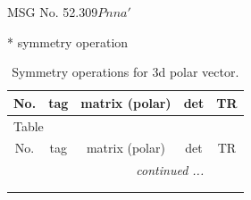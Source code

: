 \documentclass[fleqn,8pt]{jsarticle}
\begin{document}
\setcounter{MaxMatrixCols}{32}

\renewcommand{\tablename}{Table~}
\renewcommand{\figurename}{Figure~}
\begin{center}
\LARGE
MSG No. 52.309\quad$Pnna'$
\end{center}
* symmetry operation
\renewcommand{\arraystretch}{1.3}
\begin{longtable}{ccccc}
\caption{Symmetry operations for 3d polar vector.}
 \\
 \hline \hline
No. & tag & matrix (polar) & det & TR \\ \hline \endfirsthead

\multicolumn{4}{l}{\tablename\ \thetable{}} \\
 \hline \hline
No. & tag & matrix (polar) & det & TR \\ \hline \endhead

 \hline \hline
\multicolumn{4}{r}{\footnotesize\it continued ...} \\ \endfoot

 \hline \hline
\multicolumn{4}{r}{} \\ \endlastfoot


\end{longtable}
\end{document}
